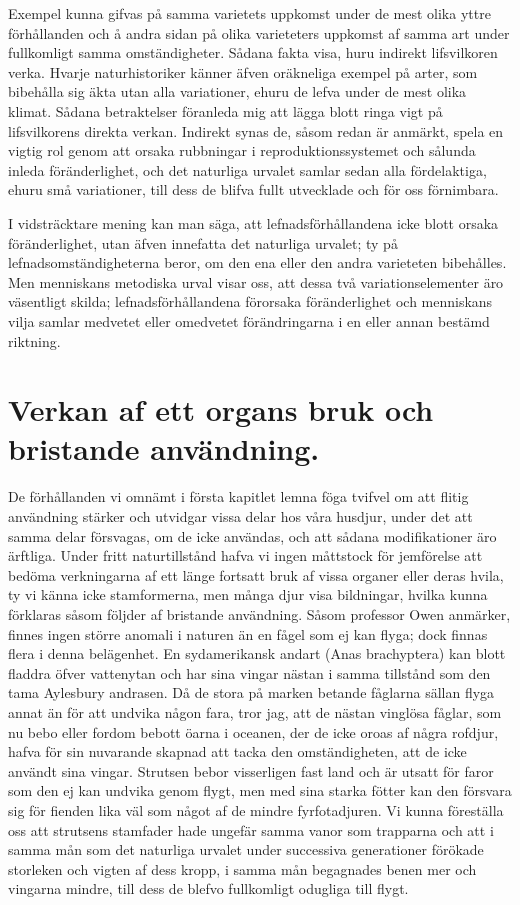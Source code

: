 Exempel kunna gifvas på samma varietets uppkomst under de mest olika yttre förhållanden och å andra sidan på olika varieteters uppkomst af samma art under fullkomligt samma omständigheter. Sådana fakta visa, huru indirekt lifsvilkoren verka. Hvarje naturhistoriker känner äfven oräkneliga exempel på arter, som bibehålla sig äkta utan alla variationer, ehuru de lefva under de mest olika klimat. Sådana betraktelser föranleda mig att lägga blott ringa vigt på lifsvilkorens direkta verkan. Indirekt synas de, såsom redan är anmärkt, spela en vigtig rol genom att orsaka rubbningar i reproduktionssystemet och sålunda inleda föränderlighet, och det naturliga urvalet samlar sedan alla fördelaktiga, ehuru små variationer, till dess de blifva fullt utvecklade och för oss förnimbara.

I vidsträcktare mening kan man säga, att lefnadsförhållandena icke blott orsaka föränderlighet, utan äfven innefatta det naturliga urvalet; ty på lefnadsomständigheterna beror, om den ena eller den andra varieteten bibehålles. Men menniskans metodiska urval visar oss, att dessa två variationselementer äro väsentligt skilda; lefnadsförhållandena förorsaka föränderlighet och menniskans vilja samlar medvetet eller omedvetet förändringarna i en eller annan bestämd riktning.



\section[Verkan av ett organs bruk]{Verkan af ett organs bruk och bristande användning.}

De förhållanden vi omnämt i första kapitlet lemna föga tvifvel om att flitig användning stärker och utvidgar vissa delar hos våra husdjur, under det att samma delar försvagas, om de icke användas, och att sådana modifikationer äro ärftliga. Under fritt naturtillstånd hafva vi ingen måttstock för jemförelse att bedöma verkningarna af ett länge fortsatt bruk af vissa organer eller deras hvila, ty vi känna icke stamformerna, men många djur visa bildningar, hvilka kunna förklaras såsom följder af bristande användning. Såsom professor Owen anmärker, finnes ingen större anomali i naturen än en fågel som ej kan flyga; dock finnas flera i denna belägenhet. En sydamerikansk andart (Anas brachyptera) kan blott fladdra öfver vattenytan och har sina vingar nästan i samma tillstånd som den tama Aylesbury andrasen. Då de stora på marken betande fåglarna sällan flyga annat än för att undvika någon fara, tror jag, att de nästan vinglösa fåglar, som nu bebo eller fordom bebott öarna i oceanen, der de icke oroas af några rofdjur, hafva för sin nuvarande skapnad att tacka den omständigheten, att de icke användt sina vingar. Strutsen bebor visserligen fast land och är utsatt för faror som den ej kan undvika genom flygt, men med sina starka fötter kan den försvara sig för fienden lika väl som något af de mindre fyrfotadjuren. Vi kunna föreställa oss att strutsens stamfader hade ungefär samma vanor som trapparna och att i samma mån som det naturliga urvalet under successiva generationer förökade storleken och vigten af dess kropp, i samma mån begagnades benen mer och vingarna mindre, till dess de blefvo fullkomligt odugliga till flygt.

